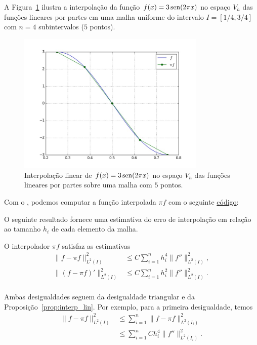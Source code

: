 \begin{ex}\label{ex:interp_linpartes}
  A Figura~\ref{fig:ex_interp_linpartes} ilustra a interpolação da função $f(x)=3\operatorname{sen}(2\pi x)$ no espaço $V_h$ das funções lineares por partes em uma malha uniforme do intervalo $I=[1/4, 3/4]$ com $n=4$ subintervalos ($5$ pontos). 

  \begin{figure}[h!]
    \centering
    \includegraphics[width=0.8\textwidth]{./cap_mef1d/dados/ex_interp_linpartes/ex_interp_linpartes}
    \caption{Interpolação linear de $f(x)=3\operatorname{sen}(2\pi x)$ no espaço $V_h$ das funções lineares por partes sobre uma malha com $5$ pontos.}
    \label{fig:ex_interp_linpartes}
  \end{figure}

\ifispython
Com o \fenics, podemos computar a função interpolada $\pi f$ com o seguinte \href{https://github.com/phkonzen/notas/blob/master/src/MetodoElementosFinitos/cap_mef1d/dados/ex_interp_linpartes/ex_interp_linpartes.py}{código}:

\fi
\end{ex}

O seguinte resultado fornece uma estimativa do erro de interpolação em relação ao tamanho $h_i$ de cada elemento da malha.

\begin{prop}\label{prop:interp_linpartes}
  O interpolador $\pi f$ satisfaz as estimativas
  \begin{align}
    \|f-\pi f\|_{L^2(I)}^2 &\leq C\sum_{i=1}^n h_i^4\|f''\|_{L^2(I)}^2,\\
    \|(f-\pi f)'\|_{L^2(I)}^2 &\leq C\sum_{i=1}^n h_i^2\|f''\|_{L^2(I)}^2.\\
  \end{align}
\end{prop}
\begin{dem}
  Ambas desigualdades seguem da desigualdade triangular e da Proposição~\ref{prop:interp_lin}. Por exemplo, para a primeira desigualdade, temos
  \begin{align}
    \|f - \pi f\|_{L^2(I)}^2 &\leq \sum_{i=1}^n \|f - \pi f\|_{L^2(I_i)}^2\\
    &\leq \sum_{i=1}^n Ch_i^4 \|f''\|_{L^2(I_i)}^2.
  \end{align}
\end{dem}

